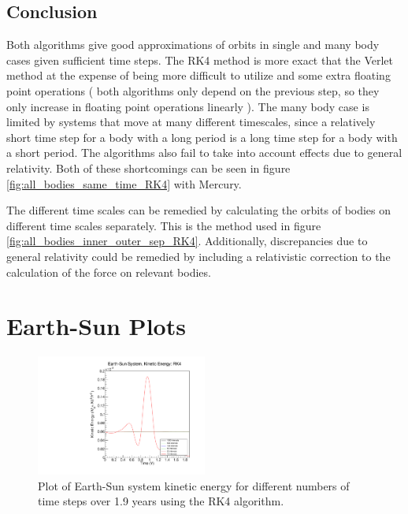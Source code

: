 \documentclass[a4paper,12pt]{report}
\begin{document}
\section{Conclusion}\label{sec:conclude}
Both algorithms give good approximations of orbits in single and many body cases given sufficient time steps. The RK4 method is more exact that the Verlet method at the expense of being more difficult to utilize and some extra floating point operations ( both algorithms only depend on the previous step, so they only increase in floating point operations linearly ). The many body case is limited by systems that move at many different timescales, since a relatively short time step for a body with a long period is a long time step for a body with a short period. The algorithms also fail to take into account effects due to general relativity. Both of these shortcomings can be seen in figure \ref{fig:all_bodies_same_time_RK4} with Mercury. 

The different time scales can be remedied by calculating the orbits of bodies on different time scales separately. This is the method used in figure \ref{fig:all_bodies_inner_outer_sep_RK4}. Additionally, discrepancies due to general relativity could be remedied by including a relativistic correction to the calculation of the force on relevant bodies.

\appendix
{}
\chapter{Earth-Sun Plots}\label{app:esplots}

\begin{figure}[H]
 \centering
   \includegraphics[width=0.5\textwidth]{ESRK4_ke.pdf}
  \caption{Plot of Earth-Sun system kinetic energy for different numbers of time steps over 1.9 years using the RK4 algorithm.}
  \label{fig:ESRK4_ke}
 \end{figure}
 
\end{document}

